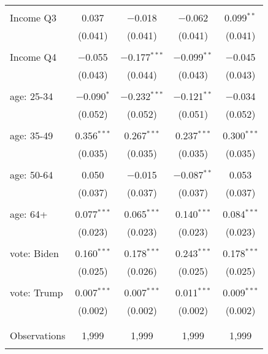 \begin{tabular}{@{\extracolsep{5pt}}lcccc}
  & & & & \\ 
 Income Q3 & 0.037 & $-$0.018 & $-$0.062 & 0.099$^{**}$ \\ 
  & (0.041) & (0.041) & (0.041) & (0.041) \\ 
  & & & & \\ 
 Income Q4 & $-$0.055 & $-$0.177$^{***}$ & $-$0.099$^{**}$ & $-$0.045 \\ 
  & (0.043) & (0.044) & (0.043) & (0.043) \\ 
  & & & & \\ 
 age: 25-34 & $-$0.090$^{*}$ & $-$0.232$^{***}$ & $-$0.121$^{**}$ & $-$0.034 \\ 
  & (0.052) & (0.052) & (0.051) & (0.052) \\ 
  & & & & \\ 
 age: 35-49 & 0.356$^{***}$ & 0.267$^{***}$ & 0.237$^{***}$ & 0.300$^{***}$ \\ 
  & (0.035) & (0.035) & (0.035) & (0.035) \\ 
  & & & & \\ 
 age: 50-64 & 0.050 & $-$0.015 & $-$0.087$^{**}$ & 0.053 \\ 
  & (0.037) & (0.037) & (0.037) & (0.037) \\ 
  & & & & \\ 
 age: 64+ & 0.077$^{***}$ & 0.065$^{***}$ & 0.140$^{***}$ & 0.084$^{***}$ \\ 
  & (0.023) & (0.023) & (0.023) & (0.023) \\ 
  & & & & \\ 
 vote: Biden & 0.160$^{***}$ & 0.178$^{***}$ & 0.243$^{***}$ & 0.178$^{***}$ \\ 
  & (0.025) & (0.026) & (0.025) & (0.025) \\ 
  & & & & \\ 
 vote: Trump & 0.007$^{***}$ & 0.007$^{***}$ & 0.011$^{***}$ & 0.009$^{***}$ \\ 
  & (0.002) & (0.002) & (0.002) & (0.002) \\ 
  & & & & \\ 
\hline \\[-1.8ex] 

Observations & 1,999 & 1,999 & 1,999 & 1,999 \\ 
\hline 
\hline \\[-1.8ex] 
\end{tabular} 